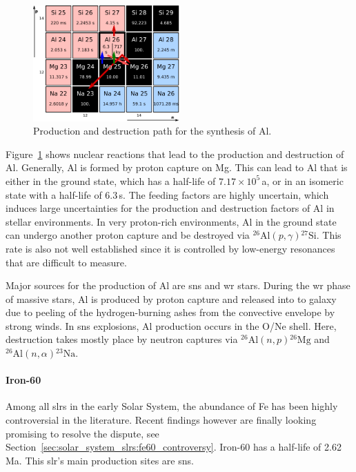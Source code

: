 \begin{figure}[tb]
    \centering
    \includegraphics[width=0.5\textwidth]{graphics/solar_system_slrs/al26_chartnuc}
    \caption{Production and destruction path for the synthesis of Al.}
    \label{fig:solar_system_slrs:al26_production_destruction}
\end{figure}
Figure~\ref{fig:solar_system_slrs:al26_production_destruction} shows nuclear reactions that lead to the production and destruction of Al. Generally, Al is formed by proton capture on Mg. This can lead to Al that is either in the ground state, which has a half-life of $7.17\times10^{5}$\,a, or in an isomeric state with a half-life of 6.3\,s. The feeding factors are highly uncertain, which induces large uncertainties for the production and destruction factors of Al in stellar environments. In very proton-rich environments, Al in the ground state can undergo another proton capture and be destroyed via $^{26}\mathrm{Al}(p,\gamma){^{27}}\mathrm{Si}$. This rate is also not well established since it is controlled by low-energy resonances that are difficult to measure. 

Major sources for the production of Al are \acp{sn} and \ac{wr} stars. During the \ac{wr} phase of massive stars, Al is produced by proton capture and released into to galaxy due to peeling of the hydrogen-burning ashes from the convective envelope by strong winds. In \acp{sn} explosions, Al production occurs in the O/Ne shell. Here, destruction takes mostly place by neutron captures via $^{26}\mathrm{Al}(n,p){^{26}}\mathrm{Mg}$ and $^{26}\mathrm{Al}(n,\alpha){^{23}}\mathrm{Na}$.

\paragraph{Iron-60}

Among all \acp{slr} in the early Solar System, the abundance of Fe has been highly controversial in the literature. Recent findings however are finally looking promising to resolve the dispute, see Section~\ref{sec:solar_system_slrs:fe60_controversy}. Iron-60 has a half-life of 2.62\,Ma. This \ac{slr}'s main production sites are \acp{sn}.

